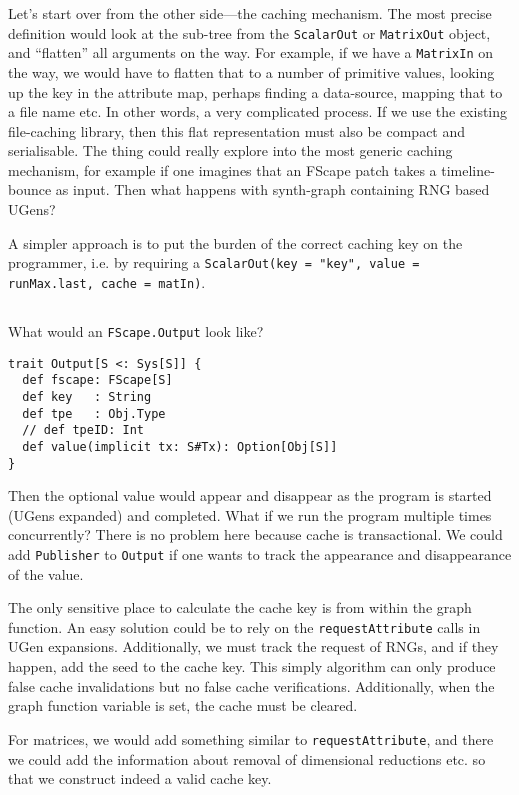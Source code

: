 \documentclass[11pt,a4paper]{article}
\begin{document}
Let's start over from the other side---the caching mechanism. The most precise definition would look at the sub-tree from the \Verb!ScalarOut! or \Verb!MatrixOut! object, and ``flatten'' all arguments on the way. For example, if we have a \Verb!MatrixIn! on the way, we would have to flatten that to a number of primitive values, looking up the key in the attribute map, perhaps finding a data-source, mapping that to a file name etc. In other words, a very complicated process. If we use the existing file-caching library, then this flat representation must also be compact and serialisable. The thing could really explore into the most generic caching mechanism, for example if one imagines that an FScape patch takes a timeline-bounce as input. Then what happens with synth-graph containing RNG based UGens?

A simpler approach is to put the burden of the correct caching key on the programmer, i.e. by requiring a \Verb!ScalarOut(key = "key", value = runMax.last, cache = matIn)!.

\subsection*{\centering *}

What would an \Verb!FScape.Output! look like?
%
\begin{lstlisting}[style=scala]
trait Output[S <: Sys[S]] {
  def fscape: FScape[S]
  def key   : String
  def tpe   : Obj.Type
  // def tpeID: Int
  def value(implicit tx: S#Tx): Option[Obj[S]]  
}
\end{lstlisting}
%
Then the optional value would appear and disappear as the program is started (UGens expanded) and completed. What if we run the program multiple times concurrently? There is no problem here because cache is transactional. We could add \Verb!Publisher! to \Verb!Output! if one wants to track the appearance and disappearance of the value.

The only sensitive place to calculate the cache key is from within the graph function. An easy solution could be to rely on the \Verb!requestAttribute! calls in UGen expansions. Additionally, we must track the request of RNGs, and if they happen, add the seed to the cache key. This simply algorithm can only produce false cache invalidations but no false cache verifications. Additionally, when the graph function variable is set, the cache must be cleared.

For matrices, we would add something similar to \Verb!requestAttribute!, and there we could add the information about removal of dimensional reductions etc. so that we construct indeed a valid cache key.
\end{document}
